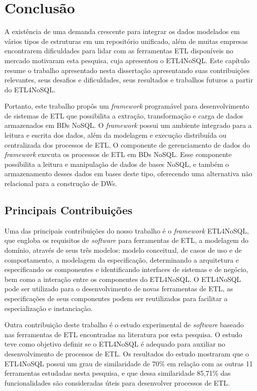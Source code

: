 \chapter{Conclusão}


A existência de uma demanda crescente para integrar os dados modelados em vários tipos de estruturas em um repositório unificado, além de muitas empresas encontrarem dificuldades para lidar com as ferramentas ETL disponíveis no mercado motivaram esta pesquisa, cuja apresentou o ETL4NoSQL. Este capítulo resume o trabalho apresentado nesta dissertação apresentando suas contribuições relevantes, seus desafios e dificuldades, seus resultados e trabalhos futuros a partir do ETL4NoSQL. 


Portanto, este trabalho propôs um \textit{framework} programável para desenvolvimento de sistemas de ETL que possibilita a extração, transformação e carga de dados armazenados em BDs NoSQL. O \textit{framework} possui um ambiente integrado para a leitura e escrita dos dados, além da modelagem e execução distribuída ou centralizada dos processos de ETL. O componente de gerenciamento de dados do \textit{framework} executa os processos de ETL em BDs NoSQL. Esse componente possibilita a leitura e manipulação de dados de bases NoSQL, e também o armazenamento desses dados em bases deste tipo, oferecendo uma alternativa não relacional para a construção de DWs.

\clearpage

\section{Principais Contribuições}

Uma das principais contribuições do nosso trabalho é o \textit{framework} ETL4NoSQL, que engloba os requisitos de \textit{software} para ferramentas de ETL, a modelagem do domínio, através de seus três modelos: modelo conceitual, de casos de uso e de comportamento, a modelagem da especificação, determinando a arquitetura e especificando os componentes e identificando interfaces de sistemas e de negócio, bem como a interação entre os componentes do ETL4NoSQL. O ETL4NoSQL pode ser utilizado para o desenvolvimento de novas ferramentas de ETL, as especificações de seus componentes podem ser reutilizados para facilitar a especialização e instanciação.

Outra contribuição deste trabalho é o estudo experimental de \textit{software} baseado nas ferramentas de ETL encontradas na literatura por esta pesquisa. O estudo teve como objetivo definir se o ETL4NoSQL é adequado para auxiliar no desenvolvimento de processos de ETL. Os resultados do estudo mostraram que o ETL4NoSQL possui um grau de similaridade de 70\% em relação com as outras 11 ferramentas estudadas nesta pesquisa, e que dessa similaridade 85,71\% das funcionalidades são consideradas úteis para desenvolver processos de ETL.

